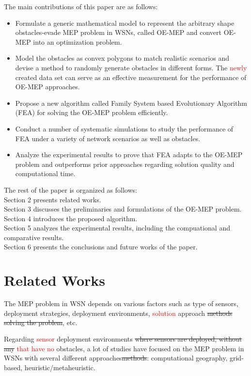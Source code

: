 \documentclass[final]{elsarticle}
\begin{document}
The main contributions of this paper are as follows:
\begin{itemize}
	\itemsep0em
	\item Formulate a generic mathematical model to represent the arbitrary shape obstacles-evade MEP problem in WSNs, called OE-MEP and convert OE-MEP into an optimization problem.
	\item Model the obstacles as convex polygons to match realistic scenarios and devise a method to randomly generate obstacles in different forms. The \textcolor{red}{newly} created data set can serve as an effective measurement for the performance of OE-MEP approaches.  
	\item Propose a new algorithm called Family System based Evolutionary Algorithm (FEA) for solving the OE-MEP problem efficiently. 
	\item Conduct a number of systematic simulations to study the performance of FEA under a variety of network scenarios as well as obstacles.
	\item Analyze the experimental results to prove that FEA adapts to the OE-MEP problem and outperforms prior approaches regarding solution quality and computational time.	
\end{itemize}
The rest of the paper is organized as follows:\\
Section 2 presents related works.\\ 
Section 3 discusses the preliminaries and formulations of the OE-MEP problem.\\ 
Section 4 introduces the proposed algorithm.\\
Section 5 analyzes the experimental results, including the compuational and comparative results. \\
Section 6 presents the conclusions and future works of the paper.\\

\section{Related Works}
The MEP problem in WSN depends on various factors such as type of sensors, deployment strategies, deployment environments, \textcolor{red}{solution} approach \sout{methods solving the problem}, etc. 

Regarding \textcolor{red}{sensor} deployment environments \sout{where sensors are deployed, without any} \textcolor{red}{that have no} obstacles, a lot of studies have focused on the MEP problem in WSNs with several different approaches\sout{methods}: computational geography, grid-based, heuristic/metaheuristic.
\end{document}
